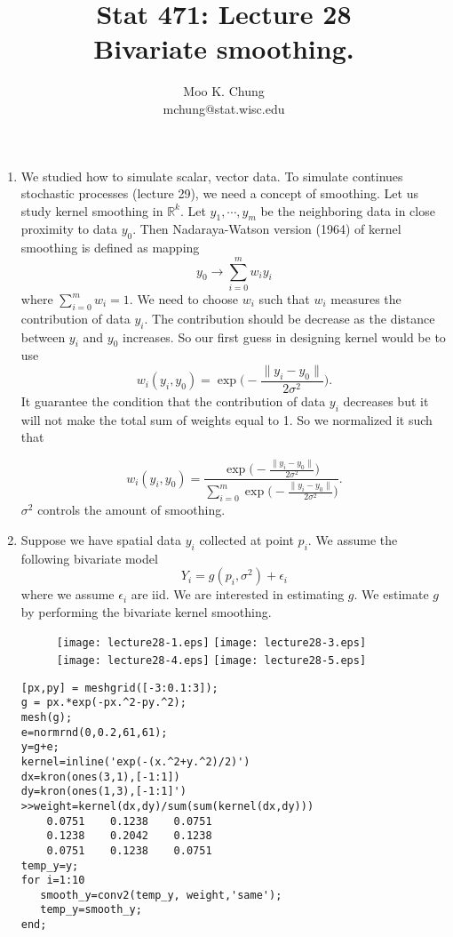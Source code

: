 \documentclass[10pt,twocolumn]{article} %
\begin{document}
\title{Stat 471: Lecture 28\\
Bivariate smoothing.}
\author{Moo K. Chung\\
mchung@stat.wisc.edu}
\maketitle \thispagestyle{empty}
\begin{enumerate}
\item We studied how to simulate scalar, vector data. To simulate
continues stochastic processes (lecture 29), we need a concept of
smoothing. Let us study kernel smoothing in $\mathbb{R}^k$. Let
$y_1,\cdots,y_m$ be the neighboring data in close proximity to
data $y_0$. Then Nadaraya-Watson version (1964) of kernel
smoothing is defined as mapping
$$ y_0 \to \sum_{i=0}^m w_iy_i$$
where $\sum_{i=0} ^m w_i =1$. We need to choose $w_i$ such that
$w_i$ measures the contribution of data $y_i$. The contribution
should be decrease as the distance between $y_i$ and $y_0$
increases. So our first guess in designing kernel would be to use
$$w_i(y_i,y_0) = \exp \Big(-\frac{\|y_i - y_0\|}{2\sigma^2} \Big).$$
It guarantee the condition that the contribution of data $y_i$
decreases but it will not make the total sum of weights equal to
1. So we normalized it such that

$$ w_i(y_i,y_0) = \frac{\exp \big(-\frac{\|y_i - y_0\|}{2\sigma^2} \big)}
{\sum_{i=0}^m \exp \big(-\frac{\|y_i - y_0\|}{2\sigma^2}\big)}.$$
$\sigma^2$ controls the amount of smoothing.

\item Suppose we have spatial data $y_i$ collected at point $p_i$.
We assume the following bivariate  model
$$Y_i = g(p_i,\sigma^2) + \epsilon_i$$
where we assume $\epsilon_i$ are iid. We are interested in
estimating $g$. We estimate $g$ by performing the bivariate kernel
smoothing.
\begin{figure}
\centering
\renewcommand{\baselinestretch}{1}
\texttt{[image: lecture28-1.eps]}
\texttt{[image: lecture28-3.eps]}
\texttt{[image: lecture28-4.eps]}
\texttt{[image: lecture28-5.eps]}
\end{figure}
\begin{verbatim}
[px,py] = meshgrid([-3:0.1:3]);
g = px.*exp(-px.^2-py.^2);
mesh(g);
e=normrnd(0,0.2,61,61);
y=g+e;
kernel=inline('exp(-(x.^2+y.^2)/2)')
dx=kron(ones(3,1),[-1:1])
dy=kron(ones(1,3),[-1:1]')
>>weight=kernel(dx,dy)/sum(sum(kernel(dx,dy)))
    0.0751    0.1238    0.0751
    0.1238    0.2042    0.1238
    0.0751    0.1238    0.0751
temp_y=y;
for i=1:10
   smooth_y=conv2(temp_y, weight,'same');
   temp_y=smooth_y;
end;
\end{verbatim}

\end{enumerate}
\end{document}
